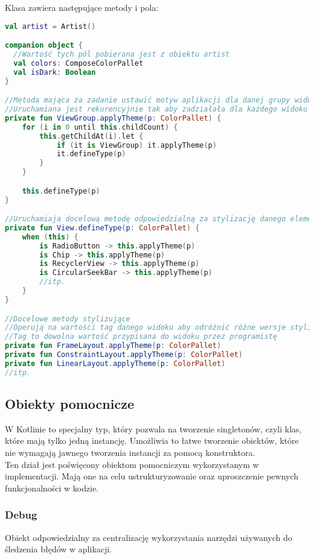 Klasa  zawiera następujące metody i pola:
\begin{lstlisting}[language=Kotlin]
val artist = Artist()

companion object {
  //Wartość tych pól pobierana jest z obiektu artist
  val colors: ComposeColorPallet
  val isDark: Boolean
}

//Metoda mająca za zadanie ustawić motyw aplikacji dla danej grupy widoków
//Uruchamiana jest rekurencyjnie tak aby zadziałała dla każdego widoku w drzewie
private fun ViewGroup.applyTheme(p: ColorPallet) {
    for (i in 0 until this.childCount) {
        this.getChildAt(i).let {
            if (it is ViewGroup) it.applyTheme(p)
            it.defineType(p)
        }
    }

    this.defineType(p)
}

//Uruchamiaja docelową metodę odpowiedzialną za stylizację danego elementu
private fun View.defineType(p: ColorPallet) {
    when (this) {
        is RadioButton -> this.applyTheme(p)
        is Chip -> this.applyTheme(p)
        is RecyclerView -> this.applyTheme(p)
        is CircularSeekBar -> this.applyTheme(p)
        //itp.
    }
}

//Docelowe metody stylizujące
//Operują na wartości tag danego widoku aby odróżnić różne wersje stylistyczne
//Tag to dowolna wartość przypisana do widoku przez programistę
private fun FrameLayout.applyTheme(p: ColorPallet)
private fun ConstraintLayout.applyTheme(p: ColorPallet)
private fun LinearLayout.applyTheme(p: ColorPallet)
//itp.

\end{lstlisting}

\newpage

\subsection{Obiekty pomocnicze}
W Kotlinie  to specjalny typ, który pozwala na tworzenie singletonów, czyli klas, które mają tylko jedną instancję. Umożliwia to łatwe tworzenie obiektów, które nie wymagają jawnego tworzenia instancji za pomocą konstruktora.\\

Ten dział jest poświęcony obiektom pomocniczym wykorzystanym w implementacji. Mają one na celu ustrukturyzowanie oraz uproszczenie pewnych funkcjonalności w kodzie.

\subsubsection{Debug}
Obiekt odpowiedzialny za centralizację wykorzystania narzędzi używanych do śledzenia błędów w aplikacji.

